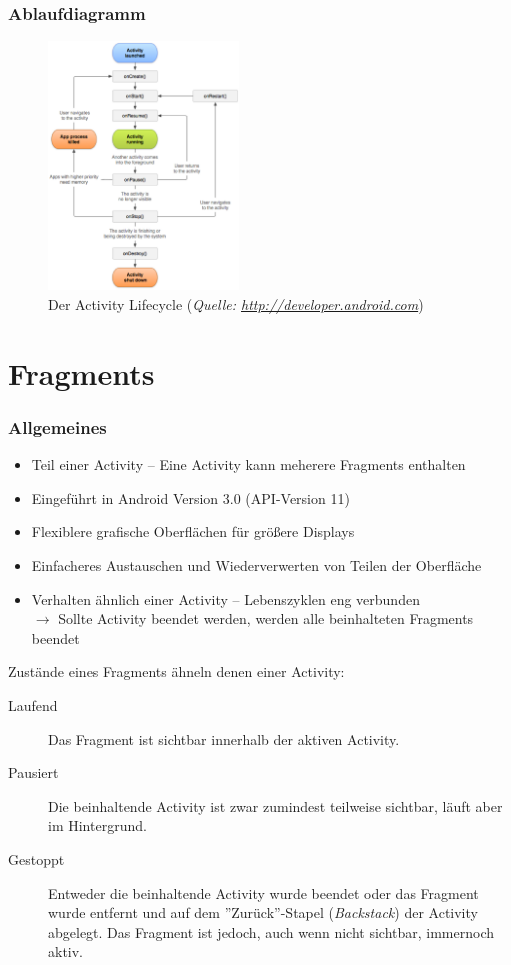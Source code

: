 \begin{frame}[label=activities_lifecycle]
   \frametitle{Ablaufdiagramm}
   \begin{figure}[h!]
     \centering
     \includegraphics[width=0.45\textwidth]{pictures/activity_lifecycle.eps}
     \caption{
        Der Activity Lifecycle 
        (\emph{Quelle: 
           \href{http://developer.android.com}{http://developer.android.com}})
     }
     \label{fig:activity_lifecycle}
   \end{figure}
\end{frame}

\section{Fragments}
\begin{frame}[label=fragments]
   \frametitle{Allgemeines}
   \begin{itemize}
      \item Teil einer Activity -- Eine Activity kann meherere Fragments enthalten
      \item Eingeführt in Android Version 3.0 (API-Version 11)
      \item Flexiblere grafische Oberflächen für größere Displays
      \item Einfacheres Austauschen und Wiederverwerten von Teilen der Oberfläche
      \item Verhalten ähnlich einer Activity -- Lebenszyklen eng verbunden\\
      	$\rightarrow$ Sollte Activity beendet werden, werden alle beinhalteten 
      		Fragments beendet
   \end{itemize}
   
   Zustände eines Fragments ähneln denen einer Activity:

	\begin{description}
		\item[Laufend] Das Fragment ist sichtbar innerhalb der aktiven Activity. 
		\item[Pausiert] Die beinhaltende Activity ist zwar zumindest teilweise sichtbar, 
			läuft aber im Hintergrund.
		\item[Gestoppt] Entweder die beinhaltende Activity wurde beendet oder 
			das Fragment wurde entfernt und auf dem ''Zurück''-Stapel (\emph{Backstack})
			der Activity abgelegt. Das Fragment ist jedoch, auch wenn nicht sichtbar, 
			immernoch aktiv.
	\end{description}
\end{frame}

